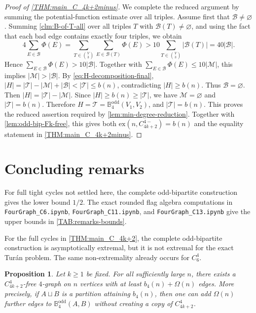 \documentclass[10pt,a4paper]{article}
\theoremstyle{plain}
\newtheorem{proposition}[proposition]{Proposition}
\theoremstyle{definition}
\newcommand{\ex}{\mathrm{ex}}
\begin{document}
\begin{proof}[Proof of \cref{THM:main_C_4k+2minus}]
We complete the reduced argument by summing the potential-function estimate over all triples. Assume first that $\mathcal B\ne\varnothing$. Summing \cref{clm:B-of-T-all} over all triples $T$ with $\mathcal B(T)\ne\varnothing$, and using the fact that each bad edge contains exactly four triples, we obtain
\[
4\sum_{E\in\mathcal B}\Phi(E)
=\sum_{T\in\binom V3}\sum_{E\in\mathcal B(T)}\Phi(E)
>10\sum_{T\in\binom V3}|\mathcal B(T)|
=40|\mathcal B|.
\]
Hence $\sum_{E\in\mathcal B}\Phi(E)>10|\mathcal B|$. 
Together with $\sum_{E\in\mathcal B}\Phi(E)\le10|\mathcal M|$, this implies $|\mathcal M|>|\mathcal B|$. By \eqref{eq:H-decomposition-final}, $|H|=|\mathcal T|-|\mathcal M|+|\mathcal B|<|\mathcal T|\le b(n)$, contradicting $|H|\ge b(n)$. Thus $\mathcal B=\varnothing$. Then $|H|=|\mathcal T|-|\mathcal M|$.
Since $|H|\ge b(n)\ge |\mathcal T|$, we have $\mathcal M=\varnothing$ and $|\mathcal T|=b(n)$. Therefore $H=\mathcal T=\mathbb{B}_4^{\mathrm{odd}}(V_1,V_2)$, and $|\mathcal T|=b(n)$.
This proves the reduced assertion required by \cref{lem:min-degree-reduction}. Together with \cref{lem:odd-bip-Fk-free}, this gives both $\ex(n,C_{4k+2}^{4-})=b(n)$ and the equality statement in \cref{THM:main_C_4k+2minus}.
\end{proof}


\section{Concluding remarks}\label{SEC:Remarks}


For full tight cycles not settled here, the complete odd-bipartite construction gives the lower bound $1/2$.
The exact rounded flag algebra computations in \texttt{FourGraph\_C6.ipynb}, \texttt{FourGraph\_C11.ipynb}, and \texttt{FourGraph\_C13.ipynb} give the upper bounds in \cref{TAB:remarks-bounds}.

For the full cycles in \cref{THM:main_C_4k+2}, the complete odd-bipartite construction is asymptotically extremal, but it is not extremal for the exact Tur\'{a}n problem.
The same non-extremality already occurs for $C_6^4$.

\begin{proposition}\label{prop:full-cycle-extra-edges}
Let $k\ge1$ be fixed.  For all sufficiently large $n$, there exists a $C_{4k+2}^{4}$-free $4$-graph on $n$ vertices with at least $b_4(n)+\Omega(n)$ edges.
More precisely, if $A\sqcup B$ is a partition attaining $b_4(n)$, then one can add $\Omega(n)$ further edges to $\mathbb{B}_{4}^{\mathrm{odd}}(A,B)$ without creating a copy of $C_{4k+2}^{4}$.
\end{proposition}
\end{document}
